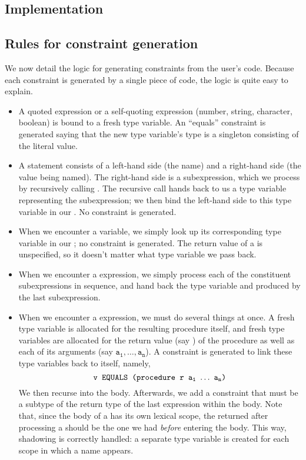 \documentclass[a4paper]{article}
\begin{document}
\subsection{Implementation}

\subsection{Rules for constraint generation}
We now detail the logic for generating constraints from the user's code.
Because each constraint is generated by a single piece of code, the logic is
quite easy to explain.

\newcommand{\lra}{\longrightarrow}
\begin{itemize}
  \item A quoted expression or a self-quoting expression (number, string,
    character, boolean) is bound to a fresh type variable.  An ``equals''
    constraint is generated saying that the new type variable's type is a
    singleton consisting of the literal value.

  \item A  statement consists of a left-hand side (the name) and a
    right-hand side (the value being named).  The right-hand side is a
    subexpression, which we process by recursively calling
    .  The recursive call hands back to us a type
    variable representing the subexpression; we then bind the left-hand side to
    this type variable in our .  No constraint is generated.

  \item When we encounter a variable, we simply look up its corresponding type
    variable in our ; no constraint is generated.  The return value of
    a  is unspecified, so it doesn't matter what type variable we pass
    back.

  \item When we encounter a  expression, we simply process each of the
    constituent subexpressions in sequence, and hand back the type variable and
     produced by the last subexpression.

  \item When we encounter a  expression, we must do several things at
    once.  A fresh type variable  is allocated for the resulting procedure
    itself, and fresh type variables are allocated for the return value (say
    ) of the procedure as well as each of its arguments (say $\mathtt{a_1,
    \ldots, a_n}$).  A constraint is generated to link these type variables back
    to  itself, namely,
    \[ \T{v EQUALS (procedure r }\mathtt{a_1\ \ldots\ a_n}\T{)} \]
    We then recurse into the body.  Afterwards, we add a constraint that 
    must be a subtype of the return type of the last expression within the body.
    Note that, since the body of a  has its own lexical scope, the
     returned after processing a  should be the one we had
    {\em before} entering the body.  This way, shadowing is correctly handled:
    a separate type variable is created for each scope in which a name appears.


\end{itemize}
\end{document}
